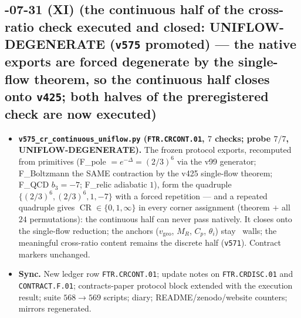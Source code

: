 \subsection*{-07-31 (XI) (the continuous half of the cross-ratio check executed and closed: UNIFLOW-DEGENERATE (\texttt{v575} promoted) --- the native exports are forced degenerate by the single-flow theorem, so the continuous half closes onto \texttt{v425}; both halves of the preregistered check are now executed)}
\begin{itemize}[leftmargin=1.5em]
\item \textbf{\texttt{v575\_cr\_continuous\_uniflow.py} (\texttt{FTR.CRCONT.01}, $7$ checks;
probe $7/7$, UNIFLOW-DEGENERATE).} The frozen protocol exports, recomputed from primitives
(F\_pole $=e^{-\Delta}=(2/3)^6$ via the v99 generator; F\_Boltzmann the SAME contraction by
the v425 single-flow theorem; F\_QCD $b_3=-7$; F\_relic adiabatic $1$), form the quadruple
$\{(2/3)^6,(2/3)^6,1,-7\}$ with a forced repetition --- and a repeated quadruple gives
$\operatorname{CR}\in\{0,1,\infty\}$ in every corner assignment (theorem $+$ all $24$
permutations): the continuous half can never pass natively.  It closes onto the single-flow
reduction; the anchors ($v_{\mathrm{geo}}$, $M_R$, $C_p$, $\theta_i$) stay \mO\ walls; the
meaningful cross-ratio content remains the discrete half (\texttt{v571}).  Contract markers
unchanged.
\item \textbf{Sync.} New ledger row \texttt{FTR.CRCONT.01}; update notes on
\texttt{FTR.CRDISC.01} and \texttt{CONTRACT.F.01}; contracts-paper protocol block extended
with the execution result; suite $568\to569$ scripts; diary; README/zenodo/website counters;
mirrors regenerated.
\end{itemize}

